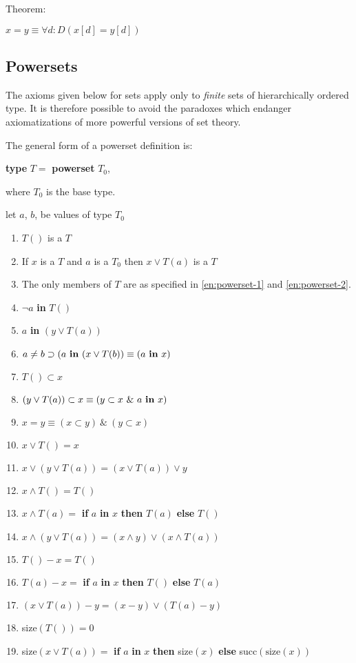 \noindent
Theorem:

$x = y \equiv \forall d:D(x[d] = y[d])$

\subsection{Powersets}

The axioms given below for sets apply only to \textit{finite} sets of hierarchically ordered type. It is therefore possible to avoid the paradoxes which endanger axiomatizations of more powerful versions of set theory.

The general form of a powerset definition is:

\quad \textbf{type} $T =$ \textbf{powerset} $T_0$,

\noindent
where $T_0$ is the base type.

\noindent
let $a$, $b$, be values of type $T_0$

\begin{enumerate}[leftmargin=2\parindent, label=(\arabic*)]
	\item \label{en:powerset-1}
	$T()$ is a $T$
	\item \label{en:powerset-2}
	If $x$ is a $T$ and $a$ is a $T_0$ then $x \vee T(a)$ is a $T$
	\item The only members of $T$ are as specified in \ref{en:powerset-1} and \ref{en:powerset-2}.
	\item $\neg a$ \textbf{in} $T()$
	\item $a$ \textbf{in} $(y \lor T(a))$
	\item $a \neq b \supset (a \text{ \textbf{in} } (x \lor T(b)) \equiv (a \text{ \textbf{in} } x)$
	\item $T() \subset x$
	\item $(y \lor T(a)) \subset x \equiv (y \subset x\ \&\ a \text{ \textbf{in} } x)$
	\item $x = y \equiv (x \subset y)\ \&\ (y \subset x)$
	\setcounter{enumi}{9}
	\item $x \lor T() = x$
	\item $x \lor (y \lor T(a)) = (x \lor T(a)) \lor y$
	\item $x \land T() = T()$
	\item $x \land T(a) =$ \textbf{if} $a$ \textbf{in} $x$ \textbf{then} $T(a)$ \textbf{else} $T()$
	\item $x \land (y \lor T(a)) = (x \land y) \lor (x \land T(a))$
	\item $T() - x = T()$
	\item $T(a) - x =$ \textbf{if} $a$ \textbf{in} $x$ \textbf{then} $T()$ \textbf{else} $T(a)$
	\item $(x \lor T(a)) - y = (x - y) \lor (T(a) - y)$
	\item size$(T()) = 0$
	\item size$(x \lor T(a)) =$ \textbf{if} $a$ \textbf{in} $x$ \textbf{then} size$(x)$ \textbf{else} succ$(\text{size}(x))$
\end{enumerate}

